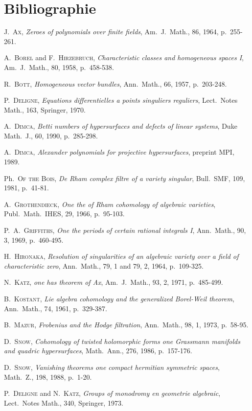 \documentclass[12pt,a4paper]{article}
\theoremstyle{plain}
\theoremstyle{definition}
\begin{document}
\section*{Bibliographie}

\begin{enumerate}[label={[\arabic*]}, leftmargin=2em, itemsep=2pt]
\item J.\ \textsc{Ax}, \textit{Zeroes of polynomials over finite fields}, Am.\ J.\ Math., 86, 1964, p.~255-261.
\item A.\ \textsc{Borel} and F.\ \textsc{Hirzebruch}, \textit{Characteristic classes and homogeneous spaces I}, Am.\ J.\ Math., 80, 1958, p.~458-538.
\item R.\ \textsc{Bott}, \textit{Homogeneous vector bundles}, Ann.\ Math., 66, 1957, p.~203-248.
\item P.\ \textsc{Deligne}, \textit{Equations differentielles a points singuliers reguliers}, Lect.\ Notes Math., 163, Springer, 1970.
\item A.\ \textsc{Dimca}, \textit{Betti numbers of hypersurfaces and defects of linear systems}, Duke Math.\ J., 60, 1990, p.~285-298.
\item A.\ \textsc{Dimca}, \textit{Alexander polynomials for projective hypersurfaces}, preprint MPI, 1989.
\item Ph.\ \textsc{Of the Bois}, \textit{De Rham complex filtre of a variety singular}, Bull.\ SMF, 109, 1981, p.~41-81.
\item A.\ \textsc{Grothendieck}, \textit{One the of Rham cohomology of algebraic varieties}, Publ.\ Math.\ IHES, 29, 1966, p.~95-103.
\item P.\ A.\ \textsc{Griffiths}, \textit{One the periods of certain rational integrals I}, Ann.\ Math., 90, 3, 1969, p.~460-495.
\item H.\ \textsc{Hironaka}, \textit{Resolution of singularities of an algebraic variety over a field of characteristic zero}, Ann.\ Math., 79, 1 and 79, 2, 1964, p.~109-325.
\item N.\ \textsc{Katz}, \textit{one has theorem of Ax}, Am.\ J.\ Math., 93, 2, 1971, p.~485-499.
\item B.\ \textsc{Kostant}, \textit{Lie algebra cohomology and the generalized Borel-Weil theorem}, Ann.\ Math., 74, 1961, p.~329-387.
\item B.\ \textsc{Mazur}, \textit{Frobenius and the Hodge filtration}, Ann.\ Math., 98, 1, 1973, p.~58-95.
\item D.\ \textsc{Snow}, \textit{Cohomology of twisted holomorphic forms one Grassmann manifolds and quadric hypersurfaces}, Math.\ Ann., 276, 1986, p.~157-176.
\item D.\ \textsc{Snow}, \textit{Vanishing theorems one compact hermitian symmetric spaces}, Math.\ Z., 198, 1988, p.~1-20.
\item[{[SGA 7 (t.~2)]}] P.\ \textsc{Deligne} and N.\ \textsc{Katz}, \textit{Groups of monodromy en geometrie algebraic}, Lect.\ Notes Math., 340, Springer, 1973.
\end{enumerate}
\end{document}
